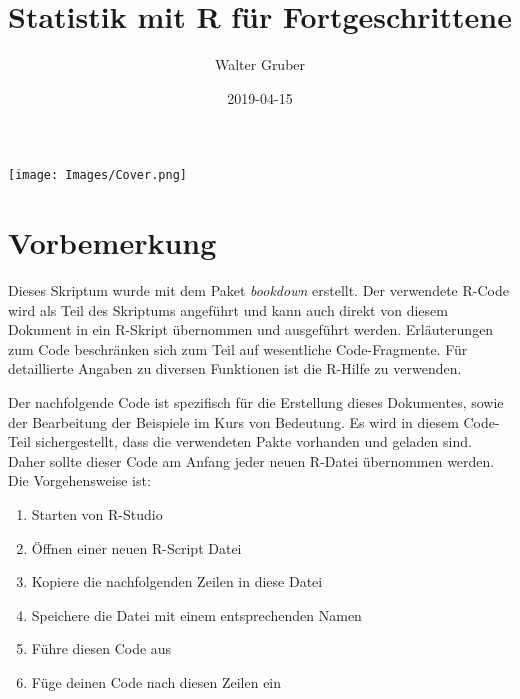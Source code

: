\documentclass[]{article}
\title{Statistik mit R für Fortgeschrittene}
\author{Walter Gruber}
\date{2019-04-15}
\providecommand{\tightlist}{%
  \setlength{\itemsep}{0pt}\setlength{\parskip}{0pt}}
\begin{document}
\maketitle

{
\setcounter{tocdepth}{2}
\tableofcontents
}
\hypertarget{section}{%
\section*{}\label{section}}

\texttt{[image: Images/Cover.png]}

\hypertarget{vorbemerkung}{%
\section*{Vorbemerkung}\label{vorbemerkung}}

Dieses Skriptum wurde mit dem Paket \emph{bookdown} erstellt. Der verwendete R-Code wird als Teil des Skriptums angeführt und kann auch direkt von diesem Dokument in ein R-Skript übernommen und ausgeführt werden. Erläuterungen zum Code beschränken sich zum Teil auf wesentliche Code-Fragmente. Für detaillierte Angaben zu diversen Funktionen ist die R-Hilfe zu verwenden.

Der nachfolgende Code ist spezifisch für die Erstellung dieses Dokumentes, sowie der Bearbeitung der Beispiele im Kurs von Bedeutung. Es wird in diesem Code-Teil sichergestellt, dass die verwendeten Pakte vorhanden und geladen sind. Daher sollte dieser Code am Anfang jeder neuen R-Datei übernommen werden. Die Vorgehensweise ist:

\begin{enumerate}
\def\labelenumi{\arabic{enumi}.}
\tightlist
\item
  Starten von R-Studio
\item
  Öffnen einer neuen R-Script Datei
\item
  Kopiere die nachfolgenden Zeilen in diese Datei
\item
  Speichere die Datei mit einem entsprechenden Namen
\item
  Führe diesen Code aus
\item
  Füge deinen Code nach diesen Zeilen ein
\end{enumerate}
\end{document}
